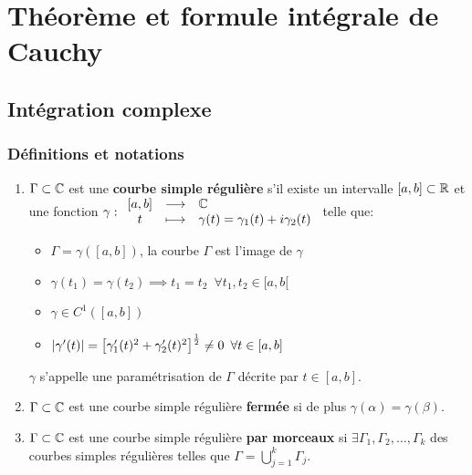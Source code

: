 \chapter{Théorème et formule intégrale de Cauchy}


\section{Intégration complexe}

\subsection{Définitions et notations}

\begin{definition}[10.1, p.73]\hfill
\begin{enumerate}[label=\arabic{enumi})]
    \item
    $\Gamma \subset \mathbb{C}$ est une \textbf{courbe simple régulière} s'il existe un intervalle $[a,b] \subset \mathbb{R}$ et une fonction $\gamma: \begin{array}{ccl} [a,b] & \longrightarrow & \mathbb{C}\\ t & \longmapsto & \gamma(t) = \gamma_1(t) + i\gamma_2(t)\end{array}$ telle que:
    
    \begin{itemize}
    \item $\Gamma = \gamma([a,b])$, la courbe $\Gamma$ est l'image de $\gamma$
    \item $\gamma(t_1) = \gamma(t_2) \implies t_1 = t_2 \enspace \forall t_1,t_2 \in [a,b[$
    \item $\gamma \in C^1\left([a,b]\right)$
    \item $\left|\gamma'(t)\right| = \left[\gamma_1'(t)^2 + \gamma_2'(t)^2\right]^\frac{1}{2} \neq 0 \enspace \forall t \in [a,b]$
    \end{itemize}

    $\gamma$ s'appelle une paramétrisation de $\Gamma$ décrite par $t \in [a,b]$.
    
    \item
    $\Gamma \subset \mathbb{C}$ est une courbe simple régulière \textbf{fermée} si de plus $\gamma(\alpha) = \gamma(\beta)$.
    
    \item
    $\Gamma \subset \mathbb{C}$ est une courbe simple régulière \textbf{par morceaux} si $\exists \Gamma_1, \Gamma_2,\ldots,\Gamma_k$ des courbes simples régulières telles que $\Gamma = \bigcup\limits_{j = 1}^k \Gamma_j$.
    

\end{enumerate}
\end{definition}
